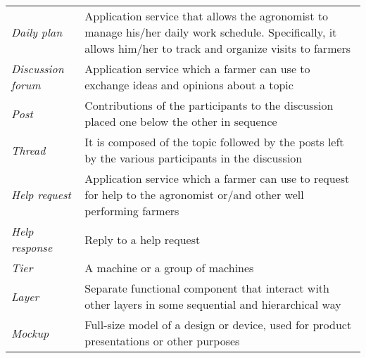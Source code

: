 \begin{center}
\begin{longtable}{|m{3.2cm}|m{8.3cm}|}
\textit{Daily plan} & Application service that allows the agronomist to manage his/her daily work schedule. Specifically, it allows him/her to track and organize visits to farmers\\
\textit{Discussion forum} & Application service which a farmer can use to exchange ideas and opinions about a topic\\
\textit{Post} & Contributions of the participants to the discussion placed one below the other in sequence\\
\textit{Thread} & It is composed of the topic followed by the posts left by the various participants in the discussion\\
\textit{Help request} & Application service which a farmer can use to request for help to the agronomist or/and other well performing farmers\\
\textit{Help response} & Reply to a help request\\
\textit{Tier} & A machine or a group of machines\\
\textit{Layer} & Separate functional component that interact with other layers in some sequential and hierarchical way\\
\textit{Mockup} & Full-size model of a design or device, used for product presentations or other purposes\\
\end{longtable}
\end{center}